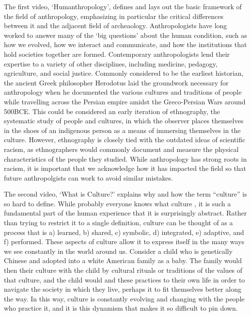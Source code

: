 \documentclass{article}
\begin{document}
The first video, `Humanthropology', defines and lays out the basic framework of the field of anthropology, emphasizing in particular the critical differences between it and the adjacent field of archeaology.
Anthropologists have long worked to answer many of the `big questions' about the human condition, such as how we evolved, how we interact and communicate, and how the institutions that hold societies together are formed.
Contemporary anthropologists lend their expertise to a variety of other disciplines, including medicine, pedagogy, agriculture, and social justice.
Commonly considered to be the earliest historian, the ancient Greek philosopher Herodotus laid the groundwork necessary for anthropology when he documented the various cultures and traditions of people while travelling across the Persian empire amidst the Greco-Persian Wars around 500BCE.
This could be considered an early iteration of ethnography, the systematic study of people and cultures, in which the observer places themselves in the shoes of an indigenous person as a means of immersing themselves in the culture.
However, ethnography is closely tied with the outdated ideas of scientific racism, as ethnographers would commonly document and measure the physical characteristics of the people they studied.
While anthropology has strong roots in racism, it is important that we acknowledge how it has impacted the field so that future anthropolgists can work to avoid similar mistakes.

The second video, `What is Culture?' explains why and how the term ``culture'' is so hard to define.
While probably everyone knows what culture , it is such a fundamental part of the human experience that it is surprisingly abstract.
Rather than trying to restrict it to a single definition, culture can be thought of as a process that is
a) learned, b) shared, c) symbolic, d) integrated, e) adaptive, and f) performed.
These aspects of culture allow it to express itself in the many ways we see constantly in the world around us.
Consider a child who is genetically Chinese and adopted into a white American family as a baby.
The family would then  their culture with the child by  cultural rituals or traditions  of the values of that culture, and the child would  and  these practices to their own life in order to navigate the society in which they live, perhaps  it to fit themselves better along the way.
In this way, culture is constantly evolving and changing with the people who practice it, and it is this dynamism that makes it so difficult to pin down.
\end{document}
